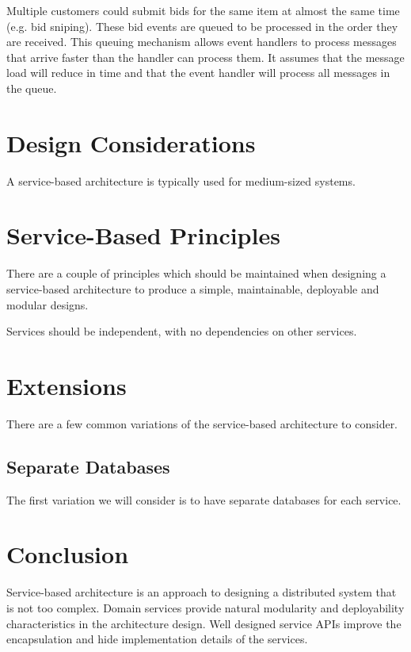 Multiple customers could submit bids for the same item at almost the same time (e.g. bid sniping).
These bid events are queued to be processed in the order they are received.
This queuing mechanism allows event handlers to process messages that arrive faster than the handler can process them.
It assumes that the message load will reduce in time and that the event handler will process all messages in the queue.


\section{Design Considerations}\label{sec:design-considerations}

A service-based architecture is typically used for medium-sized systems.


\section{Service-Based Principles}

There are a couple of principles which should be maintained when designing a service-based architecture
to produce a simple, maintainable, deployable and modular designs.

\vspace{1mm}
\begin{definition}\label{independent-service}
    Services should be independent, with no dependencies on other services.
\end{definition}



\section{Extensions}

There are a few common variations of the service-based architecture to consider.

\subsection{Separate Databases}

The first variation  we will consider is to have separate databases for each service.


\section{Conclusion}

Service-based architecture is an approach to designing a distributed system that is not too complex.
Domain services provide natural modularity and deployability characteristics in the architecture design.
Well designed service APIs improve the encapsulation and hide implementation details of the services.
